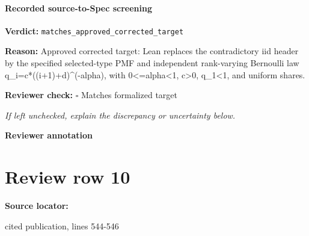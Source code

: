 \documentclass[10pt]{article}
\newcommand{\reviewerbox}{%
  \par\noindent\fbox{\parbox{0.96\linewidth}{\rule{0pt}{0.38in}}}\par
}
\newcommand{\reviewmatch}[1]{%
  \par\noindent\textbf{Reviewer check:} $\square$\; #1\par
  \noindent\emph{If left unchecked, explain the discrepancy or uncertainty below.}\par
}
\begin{document}
\paragraph{Recorded source-to-Spec screening}
\textbf{Verdict:} \texttt{matches\_approved\_corrected\_target}
\\
{\raggedright
\textbf{Reason:} Approved corrected target:\allowbreak{} Lean replaces the contradictory iid header by the specified selected-\allowbreak{}type PMF and independent rank-\allowbreak{}varying Bernoulli law q\_\allowbreak{}i=c*((i+1)+d)\textasciicircum{}(-\allowbreak{}alpha), with 0<=alpha<1, c>0, q\_\allowbreak{}1<1, and uniform shares.\allowbreak{}
\par}
\reviewmatch{Matches formalized target}
\noindent\textbf{Reviewer annotation}\par
\reviewerbox
\clearpage
\hypertarget{source-claim-6ff5481408fce970}{}
\section*{Review row 10}
\textbf{Source locator:} {\footnotesize\raggedright cited publication, lines 544-\allowbreak{}546\par}
\end{document}

